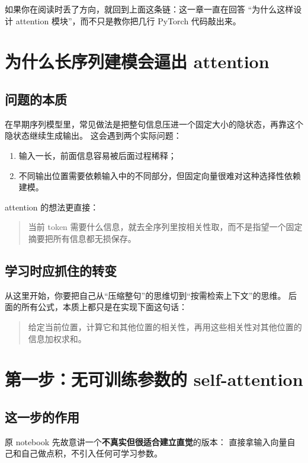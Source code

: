 \documentclass[12pt,a4paper]{ctexart}
\begin{document}
如果你在阅读时丢了方向，就回到上面这条链：这一章一直在回答
``为什么这样设计 attention 模块''，而不只是教你把几行 PyTorch 代码敲出来。

\section{为什么长序列建模会逼出 attention}

\subsection{问题的本质}

在早期序列模型里，常见做法是把整句信息压进一个固定大小的隐状态，再靠这个隐状态继续生成输出。
这会遇到两个实际问题：

\begin{enumerate}
  \item 输入一长，前面信息容易被后面过程稀释；
  \item 不同输出位置需要依赖输入中的不同部分，但固定向量很难对这种选择性依赖建模。
\end{enumerate}

attention 的想法更直接：

\begin{quote}
当前 token 需要什么信息，就去全序列里按相关性取，而不是指望一个固定摘要把所有信息都无损保存。
\end{quote}

\subsection{学习时应抓住的转变}

从这里开始，你要把自己从``压缩整句''的思维切到``按需检索上下文''的思维。
后面的所有公式，本质上都只是在实现下面这句话：

\begin{quote}
给定当前位置，计算它和其他位置的相关性，再用这些相关性对其他位置的信息加权求和。
\end{quote}

\section{第一步：无可训练参数的 self-attention}

\subsection{这一步的作用}

原 notebook 先故意讲一个\textbf{不真实但很适合建立直觉}的版本：
直接拿输入向量自己和自己做点积，不引入任何可学习参数。
\end{document}
